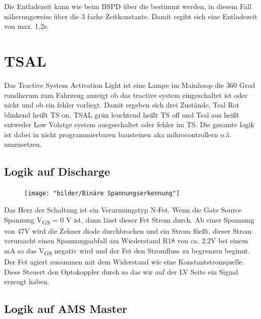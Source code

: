 Die Entladezeit kann wie beim BSPD über die bestimmt werden, in diesem Fall näherungsweise über die 3 fache Zeitkonstante. Damit ergibt sich eine Entladezeit von max. 1,2s.

\FloatBarrier
\section{TSAL}
Das Tractive System Activation Light ist eine Lampe im Mainhoop die 360 Grad rundherum zum Fahrzeug anzeigt ob das tractive system eingeschaltet ist oder nicht und ob ein fehler vorliegt. Damit ergeben sich drei Zustände, Tsal Rot blinkend heißt TS on, TSAL grün leuchtend heißt TS off und Tsal aus heißt entweder Low Volatge system ausgeschaltet oder fehler im TS. Die gesamte logik ist dabei in nicht programmierbaren bausteinen aka mikrocontrollern o.ä. umzusetzen.

\FloatBarrier
\subsection{Logik auf Discharge}
\label{sec: TSAL Logik Discharge}
\begin{figure}
	\centering
	\texttt{[image: "bilder/Binäre Spannungserkennung"]}
	\caption{}
	\label{fig:binare-spannungserkennung}
\end{figure}

Das Herz der Schaltung ist ein Verarmungstyp N-Fet. Wenn die Gate Source Spannung V\textsubscript{GS} = 0 V ist, dann lässt dieser Fet Strom durch. Ab einer Spannung von 47V wird die Zehner diode durchbrochen und ein Strom fließt, dieser Strom verursacht einen Spannungsabfall am Wiederstand R18 von ca. 2,2V bei einem mA so das V\textsubscript{GS} negativ wird und der Fet den Stromfluss zu begrenzen beginnt. Der Fet agiert zusammen mit dem Widerstand wie eine Konstantstromquelle. Diese Steuert den Optokoppler durch so das wir auf der LV Seite ein Signal erzeugt haben.

\FloatBarrier
\subsection{Logik auf AMS Master}

